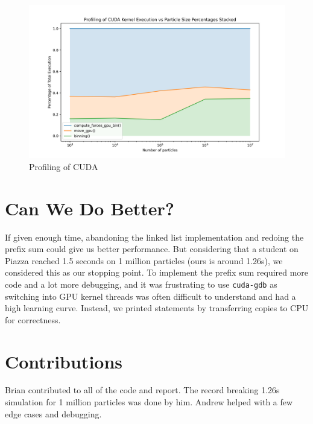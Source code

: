 \documentclass{article}
\begin{document}
\begin{figure}[H]
    \centerline{\includegraphics[width=6in]{figures/profiling-stacked-percentage.png}}
    \caption{Profiling of CUDA}
    \label{fig:profile-stacked-percentage}
\end{figure}

\section{Can We Do Better?}
If given enough time, abandoning the linked list implementation and redoing the prefix sum could give us better performance. But considering that a student on Piazza reached 1.5 seconds on 1 million particles (ours is around 1.26s), we considered this as our stopping point. To implement the prefix sum required more code and a lot more debugging, and it was frustrating to use \verb|cuda-gdb| as switching into GPU kernel threads was often difficult to understand and had a high learning curve. Instead, we printed statements by transferring copies to CPU for correctness.

\section{Contributions}
Brian contributed to all of the code and report. The record breaking 1.26s simulation for 1 million particles was done by him. Andrew helped with a few edge cases and debugging.
\end{document}
